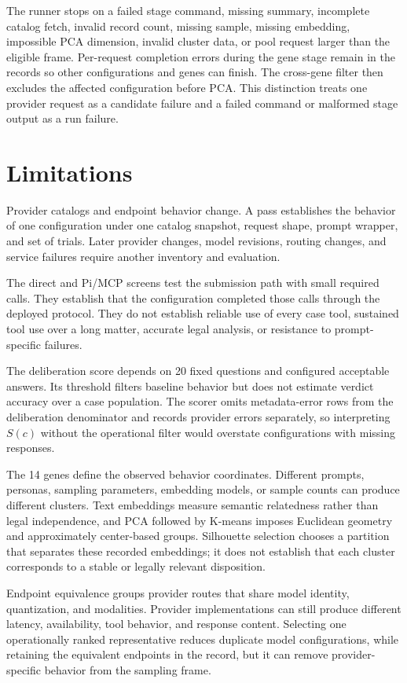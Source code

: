 \documentclass[11pt]{article}
\begin{document}
The runner stops on a failed stage command, missing summary, incomplete catalog fetch, invalid record count, missing sample, missing embedding, impossible PCA dimension, invalid cluster data, or pool request larger than the eligible frame.  Per-request completion errors during the gene stage remain in the records so other configurations and genes can finish.  The cross-gene filter then excludes the affected configuration before PCA.  This distinction treats one provider request as a candidate failure and a failed command or malformed stage output as a run failure.

\section{Limitations}

Provider catalogs and endpoint behavior change.  A pass establishes the behavior of one configuration under one catalog snapshot, request shape, prompt wrapper, and set of trials.  Later provider changes, model revisions, routing changes, and service failures require another inventory and evaluation.

The direct and Pi/MCP screens test the submission path with small required calls.  They establish that the configuration completed those calls through the deployed protocol.  They do not establish reliable use of every case tool, sustained tool use over a long matter, accurate legal analysis, or resistance to prompt-specific failures.

The deliberation score depends on 20 fixed questions and configured acceptable answers.  Its threshold filters baseline behavior but does not estimate verdict accuracy over a case population.  The scorer omits metadata-error rows from the deliberation denominator and records provider errors separately, so interpreting $S(c)$ without the operational filter would overstate configurations with missing responses.

The 14 genes define the observed behavior coordinates.  Different prompts, personas, sampling parameters, embedding models, or sample counts can produce different clusters.  Text embeddings measure semantic relatedness rather than legal independence, and PCA followed by K-means imposes Euclidean geometry and approximately center-based groups.  Silhouette selection chooses a partition that separates these recorded embeddings; it does not establish that each cluster corresponds to a stable or legally relevant disposition.

Endpoint equivalence groups provider routes that share model identity, quantization, and modalities.  Provider implementations can still produce different latency, availability, tool behavior, and response content.  Selecting one operationally ranked representative reduces duplicate model configurations, while retaining the equivalent endpoints in the record, but it can remove provider-specific behavior from the sampling frame.
\end{document}
